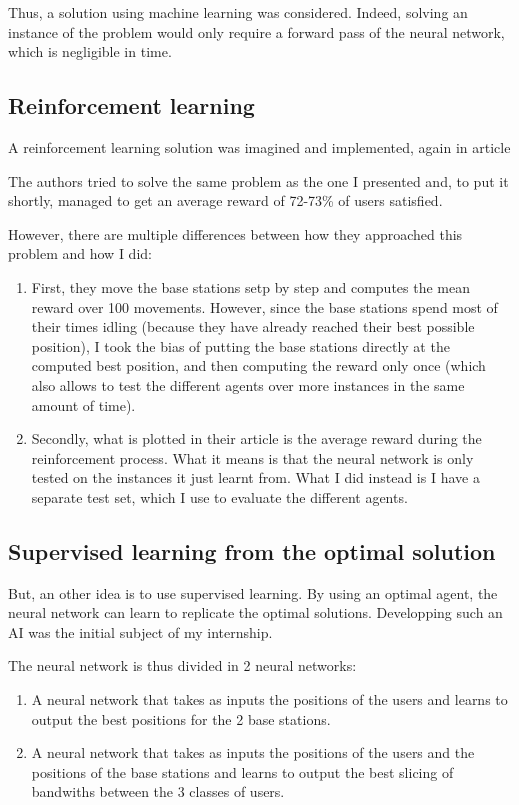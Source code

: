 \documentclass[letterpaper]{article}
\begin{document}
Thus, a solution using machine learning was considered.
Indeed, solving an instance of the problem would only require a forward pass of the neural network, which is negligible in time.

\subsection{Reinforcement learning}

A reinforcement learning solution was imagined and implemented, again in article\;\cite{main_article}

The authors tried to solve the same problem as the one I presented and, to put it shortly, managed to get an average reward of 72-73\% of users satisfied.

However, there are multiple differences between how they approached this problem and how I did:

\begin{enumerate}
    \item First, they move the base stations setp by step and computes the mean reward over 100 movements.
          However, since the base stations spend most of their times idling (because they have already reached their best possible position),
          I took the bias of putting the base stations directly at the computed best position, and then computing the reward only once (which also allows to test the different agents over more instances in the same amount of time).
    \item Secondly, what is plotted in their article is the average reward during the reinforcement process.
          What it means is that the neural network is only tested on the instances it just learnt from.
          What I did instead is I have a separate test set, which I use to evaluate the different agents.
\end{enumerate}

\subsection{Supervised learning from the optimal solution}

But, an other idea is to use supervised learning.
By using an optimal agent, the neural network can learn to replicate the optimal solutions.
Developping such an AI was the initial subject of my internship.

The neural network is thus divided in 2 neural networks:

\begin{enumerate}
    \item A neural network that takes as inputs the positions of the users and learns to output the best positions for the 2 base stations.
    \item A neural network that takes as inputs the positions of the users and the positions of the base stations and learns to output the best slicing of bandwiths between the 3 classes of users.
\end{enumerate}
\end{document}
